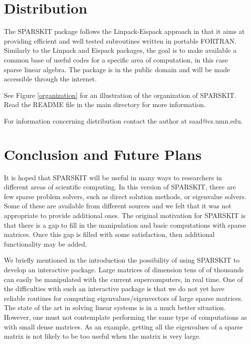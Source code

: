 \section{Distribution}
The SPARSKIT package 
follows the Linpack-Eispack approach in that it  aims at providing
efficient and well tested subroutines written in portable FORTRAN.
Similarly to the Linpack and Eispack packages, the goal is to
make available a common base of useful codes for a specific 
area of computation, in this case sparse linear algebra.
The package is in the public domain and will be made 
accessible through the internet.

See Figure \ref{organization} for an illustration of the organization
of SPARSKIT.  Read the README file in the main directory for more
information.


For information concerning distribution contact the author at
saad@cs.umn.edu.

\section{Conclusion and Future Plans}
It is hoped that SPARSKIT will be useful in many 
ways to researchers in different areas of scientific computing.
In this version of SPARSKIT, there are few sparse
problem solvers, such as direct solution methods, or 
eigenvalue solvers. Some of these are available from different
sources and we felt that it was not appropriate to provide
additional ones. The original 
motivation for SPARSKIT is  that there is 
a gap to fill in the manipulation and basic computations
with sparse matrices. Once this gap is filled with some
satisfaction, then additional functionality may be added.

We briefly mentioned in the introduction the possibility of using 
SPARSKIT to develop an interactive package.
Large matrices of dimension tens of of thousands can 
easily be manipulated with the current supercomputers, 
in real time. One of the difficulties
with such an interactive package is that we do not yet
have reliable routines for computing eigenvalues/eigenvectors of
large sparse matrices. The state of the art in solving linear 
systems is in a much better situation. However, one must not 
contemplate performing the same type of computations as with 
small dense matrices. As an example,
getting all the eigenvalues of a sparse matrix is not likely
to be too useful when the matrix is very large.

